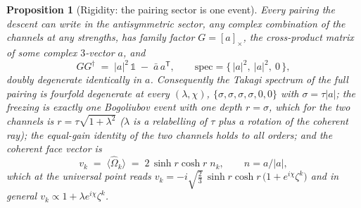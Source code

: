 \documentclass[11pt]{article}
\newtheorem{proposition}[theorem]{Proposition}
\theoremstyle{definition}
\begin{document}
\begin{proposition}[Rigidity: the pairing sector is one event]\label{prop:rigidity}
Every pairing the descent can write in the antisymmetric sector, any complex combination of the channels at any strengths, has family factor $G = [a]_{\times}$, the cross-product matrix of some complex $3$-vector $a$, and
\begin{equation}\label{eq:gram}
G G^{\dagger} \;=\; |a|^{2}\,\mathbb{1} \;-\; \bar{a}\,a^{\mathsf{T}}, \qquad \mathrm{spec} = \{\,|a|^{2},\ |a|^{2},\ 0\,\},
\end{equation}
doubly degenerate identically in $a$. Consequently the Takagi spectrum of the full pairing is fourfold degenerate at every $(\lambda, \chi)$, $\{\sigma, \sigma, \sigma, \sigma, 0, 0\}$ with $\sigma = \tau|a|$; the freezing is exactly one Bogoliubov event with one depth $r = \sigma$, which for the two channels is $r = \tau\sqrt{1 + \lambda^{2}}$ ($\lambda$ is a relabelling of $\tau$ plus a rotation of the coherent ray); the equal-gain identity of the two channels holds to all orders; and the coherent face vector is
\[
v_{k} \;=\; \langle \hat\Omega_{k}\rangle \;=\; 2\,\sinh r\cosh r\;n_{k}, \qquad n = a/|a|,
\]
which at the universal point reads $v_{k} = -i\sqrt{\tfrac{2}{3}}\,\sinh r\cosh r\,\bigl(1 + e^{i\chi}\zeta^{k}\bigr)$ and in general $v_{k} \propto 1 + \lambda e^{i\chi}\zeta^{k}$.
\end{proposition}
\end{document}

